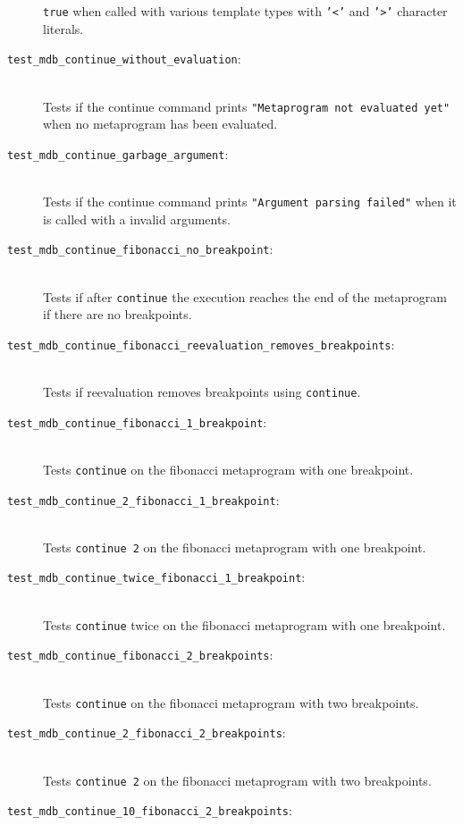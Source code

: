 \begin{description}
        \texttt{true} when called with various template types with
        \texttt{'<'} and \texttt{'>'} character literals.
    \item[\texttt{test\_mdb\_continue\_without\_evaluation}:] \hfill \\
        Tests if the continue command prints
        \texttt{"Metaprogram not evaluated yet"} when no metaprogram has been
        evaluated.
    \item[\texttt{test\_mdb\_continue\_garbage\_argument}:] \hfill \\
        Tests if the continue command prints
        \texttt{"Argument parsing failed"} when it is called with a invalid
        arguments.
    \item[\texttt{test\_mdb\_continue\_fibonacci\_no\_breakpoint}:] \hfill \\
        Tests if after \texttt{continue} the execution reaches the end of the
        metaprogram if there are no breakpoints.
    \item[\texttt{test\_mdb\_continue\_fibonacci\_reevaluation\_removes\_breakpoints}:] \hfill \\
        Tests if reevaluation removes breakpoints using \texttt{continue}.
    \item[\texttt{test\_mdb\_continue\_fibonacci\_1\_breakpoint}:] \hfill \\
        Tests \texttt{continue} on the fibonacci metaprogram with one
        breakpoint.
    \item[\texttt{test\_mdb\_continue\_2\_fibonacci\_1\_breakpoint}:] \hfill \\
        Tests \texttt{continue 2} on the fibonacci metaprogram with one
        breakpoint.
    \item[\texttt{test\_mdb\_continue\_twice\_fibonacci\_1\_breakpoint}:] \hfill \\
        Tests \texttt{continue} twice on the fibonacci metaprogram with one
        breakpoint.
    \item[\texttt{test\_mdb\_continue\_fibonacci\_2\_breakpoints}:] \hfill \\
        Tests \texttt{continue} on the fibonacci metaprogram with two
        breakpoints.
    \item[\texttt{test\_mdb\_continue\_2\_fibonacci\_2\_breakpoints}:] \hfill \\
        Tests \texttt{continue 2} on the fibonacci metaprogram with two
        breakpoints.
    \item[\texttt{test\_mdb\_continue\_10\_fibonacci\_2\_breakpoints}:] \hfill \\

\end{description}
